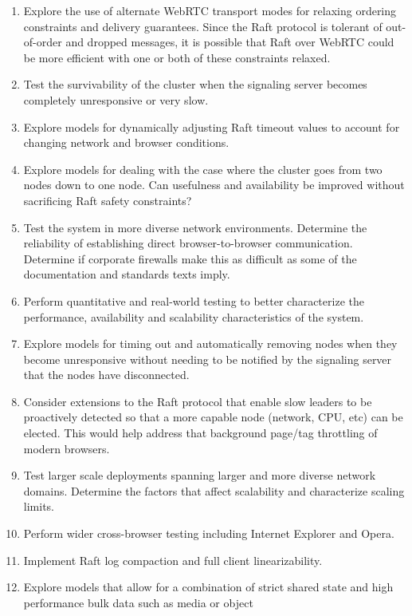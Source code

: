 \documentclass[conference,compsoc]{./IEEEtran/IEEEtran}
\begin{document}
\begin{enumerate}
\item Explore the use of alternate WebRTC transport modes for relaxing
    ordering constraints and delivery guarantees. Since the Raft
    protocol is tolerant of out-of-order and dropped messages, it is
    possible that Raft over WebRTC could be more efficient with one or
    both of these constraints relaxed.
\item Test the survivability of the cluster when the signaling server
    becomes completely unresponsive or very slow.
\item Explore models for dynamically adjusting Raft timeout values to
    account for changing network and browser conditions.
\item Explore models for dealing with the case where the cluster goes
    from two nodes down to one node. Can usefulness and availability
    be improved without sacrificing Raft safety constraints?
\item Test the system in more diverse network environments. Determine
    the reliability of establishing direct browser-to-browser
    communication.  Determine if corporate firewalls make this as
    difficult as some of the documentation and standards texts imply. %
\item Perform quantitative and real-world testing to better
    characterize the performance, availability and scalability
    characteristics of the system.
\item Explore models for timing out and automatically removing nodes
    when they become unresponsive without needing to be notified by
    the signaling server that the nodes have disconnected.
\item Consider extensions to the Raft protocol that enable slow
    leaders to be proactively detected so that a more capable node
    (network, CPU, etc) can be elected. This would help address that
    background page/tag throttling of modern browsers.
\item Test larger scale deployments spanning larger and more diverse
    network domains. Determine the factors that affect scalability and
    characterize scaling limits.
\item Perform wider cross-browser testing including Internet Explorer
    and Opera.
\item Implement Raft log compaction and full client linearizability.
\item Explore models that allow for a combination of strict shared
    state and high performance bulk data such as media or object

\end{enumerate}
\end{document}
